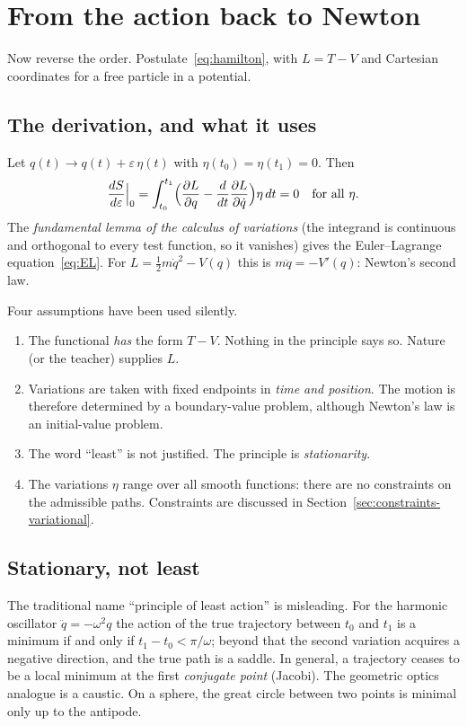 \section{From the action back to Newton}
\label{sec:action-to-newton}

Now reverse the order. Postulate~\eqref{eq:hamilton}, with $L=T-V$ and
Cartesian coordinates for a free particle in a potential.

\subsection{The derivation, and what it uses}

Let $q(t)\to q(t)+\varepsilon\,\eta(t)$ with $\eta(t_0)=\eta(t_1)=0$. Then
\[
  \frac{dS}{d\varepsilon}\Big|_0=\int_{t_0}^{t_1}
  \Bigl(\frac{\partial L}{\partial q}-\frac{d}{dt}\frac{\partial L}{\partial\dot q}\Bigr)\eta\,dt=0
  \quad\text{for all }\eta .
\]
The \emph{fundamental lemma of the calculus of variations} (the integrand is
continuous and orthogonal to every test function, so it vanishes) gives the
Euler--Lagrange equation~\eqref{eq:EL}. For $L=\tfrac12m\dot q^2-V(q)$ this is
$m\ddot q=-V'(q)$: Newton's second law.

Four assumptions have been used silently.
\begin{enumerate}
  \item The functional \emph{has} the form $T-V$. Nothing in the principle
  says so. Nature (or the teacher) supplies $L$.
  \item Variations are taken with fixed endpoints in \emph{time and
  position}. The motion is therefore determined by a boundary-value problem,
  although Newton's law is an initial-value problem.
  \item The word ``least'' is not justified. The principle is
  \emph{stationarity}.
  \item The variations $\eta$ range over all smooth functions: there are no
  constraints on the admissible paths. Constraints are discussed in
  Section~\ref{sec:constraints-variational}.
\end{enumerate}

\subsection{Stationary, not least}
\label{sec:least}

The traditional name ``principle of least action'' is misleading. For the
harmonic oscillator $\ddot q=-\omega^2q$ the action of the true trajectory
between $t_0$ and $t_1$ is a minimum if and only if $t_1-t_0<\pi/\omega$;
beyond that the second variation acquires a negative direction, and the
true path is a saddle. In general, a trajectory ceases to be a local minimum
at the first \emph{conjugate point} (Jacobi). The geometric optics analogue is
a caustic. On a sphere, the great circle between two points is minimal only
up to the antipode.

